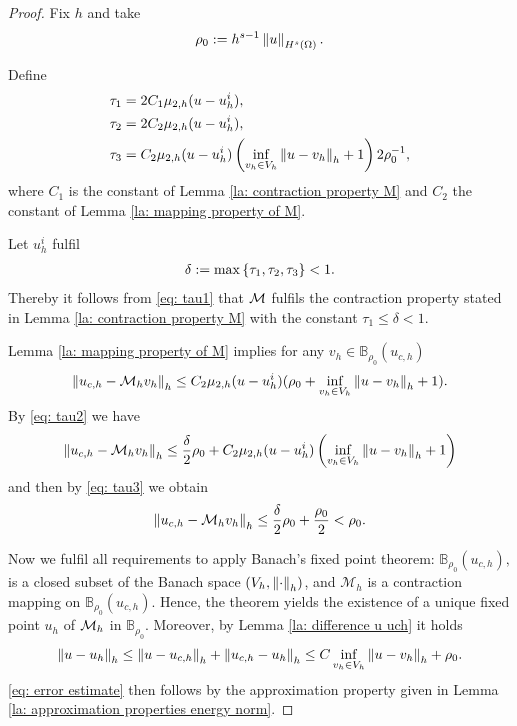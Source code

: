\begin{proof}
	Fix $h$ and take
	\begin{align}
		\rho_0:= h^{s-1} \left\lVert u \right\rVert_{H^{s}(\Omega)}. \label{eq: definition rho0}
	\end{align}
	
	Define 
	\begin{align}
		\tau_1 &= 2 C_1 \mu_{2,h}(u-u_h^i), \label{eq: tau1}\\
		\tau_2 & = 2 C_2 \mu_{2,h}(u-u_h^i), \label{eq: tau2}\\
		\tau_3 & = C_2 \mu_{2,h}(u-u_h^i) \left(\inf_{v_h \in V_h} \left\lVert u-v_h \right\rVert_{h}+1\right) 2 \rho_0^{-1} \label{eq: tau3},
	\end{align}
	where $C_1$ is the constant of Lemma \ref{la: contraction property M} and $C_2$ the constant of Lemma \ref{la: mapping property of M}. 
	
	Let $u_h^i$ fulfil
	\begin{align}
		\delta := \operatorname{max} \left\{ \tau_1, \tau_2, \tau_3 \right\} < 1.
	\end{align}
	Thereby it follows from \eqref{eq: tau1} that $\mathcal M$ fulfils the contraction property stated in Lemma \ref{la: contraction property M} with the constant $\tau_1\leq \delta<1$.
	
	Lemma \ref{la: mapping property of M} implies for any $v_h \in \mathbb{B}_{\rho_0}(u_{c,h})$
	 \[
	 	\left\lVert u_{c,h} - \mathcal M_h v_h \right\rVert_{h} \leq 
	 		C_2 \mu_{2,h}(u - u^i_h) (\rho_0+ \inf_{v_h \in V_h} \left\lVert u-v_h \right\rVert_{h}+1).
	 \]
	By \eqref{eq: tau2} we have 
	 \[
	 	\left\lVert u_{c,h} - \mathcal M_h v_h \right\rVert_{h} \leq 
	 		\frac \delta 2 \rho_0 
	 			+ C_2  \mu_{2,h}(u - u^i_h) \left( \inf_{v_h \in V_h} \left\lVert u-v_h \right\rVert_{h}+1\right)
	 \]
	 and then by \eqref{eq: tau3} we obtain
	 \begin{align}
	 	\left\lVert u_{c,h} - \mathcal M_h v_h \right\rVert_{h} \leq 
	 		\frac \delta 2 \rho_0 
	 		+ \frac {\rho_0} 2  < \rho_0. \label{eq: self mapping M}
	 \end{align} 
	 
	 Now we fulfil all requirements to apply Banach's fixed point theorem: $\mathbb{B}_{\rho_0}(u_{c,h}), $ is a closed subset of the Banach space $(V_h, \left\lVert \cdot \right\rVert_{h})$, and $\mathcal M_h$ is a contraction mapping on $ \mathbb{B}_{\rho_0}(u_{c,h})$. Hence, the theorem yields the existence of a unique fixed point $u_h$ of $\mathcal M_h$ in $\mathbb B_{\rho_0}$.
	 Moreover, by Lemma \ref{la: difference u uch} it holds
	 \begin{align}
	 	\left\lVert u-u_h \right\rVert_{h} \leq \left\lVert u-u_{c,h} \right\rVert_{h} + \left\lVert u_{c,h} - u_h \right\rVert_{h} \leq C \inf_{v_h \in V_h} \left\lVert u-v_h \right\rVert_{h} +\rho_0.
	\end{align}
	\eqref{eq: error estimate} then follows by the approximation property given in Lemma \ref{la: approximation properties energy norm}.
	

\end{proof}
